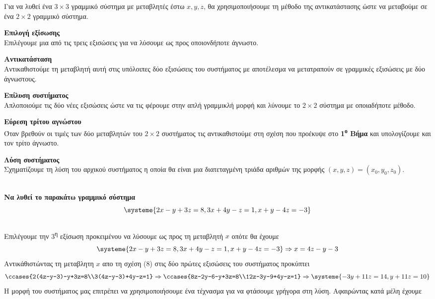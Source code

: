 \documentclass[twoside,nofonts,internet,methodoi]{thewria}
\newcommand{\tss}[1]{\textsuperscript{#1}}
\begin{document}
\begin{Methodos}
Για να λυθεί ένα $ 3\times 3 $ γραμμικό σύστημα με μεταβλητές έστω $ x,y,z $, θα χρησιμοποιήσουμε τη μέθοδο της αντικατάστασης ώστε να μεταβούμε σε ένα $ 2\times 2 $ γραμμικό σύστημα.
\begin{bhma}
\item \textbf{Επιλογή εξίσωσης}\\
Επιλέγουμε μια από τις τρεις εξισώσεις για να λύσουμε ως προς οποιονδήποτε άγνωστο.
\item \textbf{Αντικατάσταση}\\
Αντικαθιστούμε τη μεταβλητή αυτή στις υπόλοιπες δύο εξισώσεις του συστήματος με αποτέλεσμα να μετατραπούν σε γραμμικές εξισώσεις με δύο άγνωστους.
\item \textbf{Επίλυση συστήματος {}}\\
Απλοποιούμε τις δύο νέες εξισώσεις ώστε να τις φέρουμε στην απλή γραμμικλή μορφή και λύνουμε το $ 2\times 2 $ σύστημα με οποιαδήποτε μέθοδο.
\item \textbf{Εύρεση τρίτου αγνώστου}\\
Όταν βρεθούν οι τιμές των δύο μεταβλητών του $ 2\times 2 $ συστήματος τις αντικαθιστούμε στη σχέση που προέκυψε στο \textbf{1\tss{ο} Βήμα} και υπολογίζουμε και τον τρίτο άγνωστο.
\item \textbf{Λύση συστήματος}\\
Σχηματίζουμε τη λύση του αρχικού συστήματος η οποία θα είναι μια διατεταγμένη τριάδα αριθμών της μορφής $ (x,y,z)=(x_0,y_0,z_0) $.
\end{bhma}
\end{Methodos}\mbox{}\\
\textbf{Να λυθεί το παρακάτω γραμμικό σύστημα}
{\boldmath\[ \systeme{2x-y+3z=8,3x+4y-z=1,x+y-4z=-3} \]}
\lysh\\
Επιλέγουμε την 3\tss{η} εξίσωση προκειμένου να λύσουμε ως προς τη μεταβλητή $ x $ οπότε θα έχουμε
\begin{equation} \systeme{2x-y+3z=8,3x+4y-z=1,x+y-4z=-3}\Rightarrow x=4z-y-3 
\end{equation}
Αντικάθιστώντας τη μεταβλητη $ x $ απο τη σχέση (8) στις δύο πρώτες εξισώσεις του συστήματος προκύπτει
\[ \ccases{2(4z-y-3)-y+3z=8\\3(4z-y-3)+4y-z=1}\Rightarrow\ccases{8z-2y-6-y+3z=8\\12z-3y-9+4y-z=1}\Rightarrow
\systeme{-3y+11z=14,y+11z=10} \]
Η μορφή του συστήματος μας επιτρέπει να χρησιμοποιήσουμε ένα τέχνασμα για να φτάσουμε γρήγορα στη λύση. Αφαιρώντας κατά μέλη έχουμε
\end{document}
